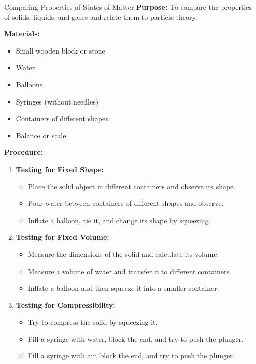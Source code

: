 \begin{investigation}{Comparing Properties of States of Matter}
\textbf{Purpose:} To compare the properties of solids, liquids, and gases and relate them to particle theory.

\textbf{Materials:}
\begin{itemize}
    \item Small wooden block or stone
    \item Water
    \item Balloons
    \item Syringes (without needles)
    \item Containers of different shapes
    \item Balance or scale
\end{itemize}

\textbf{Procedure:}
\begin{enumerate}
    \item \textbf{Testing for Fixed Shape:}
    \begin{itemize}
        \item Place the solid object in different containers and observe its shape.
        \item Pour water between containers of different shapes and observe.
        \item Inflate a balloon, tie it, and change its shape by squeezing.
    \end{itemize}
    
    \item \textbf{Testing for Fixed Volume:}
    \begin{itemize}
        \item Measure the dimensions of the solid and calculate its volume.
        \item Measure a volume of water and transfer it to different containers.
        \item Inflate a balloon and then squeeze it into a smaller container.
    \end{itemize}
    
    \item \textbf{Testing for Compressibility:}
    \begin{itemize}
        \item Try to compress the solid by squeezing it.
        \item Fill a syringe with water, block the end, and try to push the plunger.
        \item Fill a syringe with air, block the end, and try to push the plunger.
    \end{itemize}
    

\end{enumerate}
\end{investigation}
